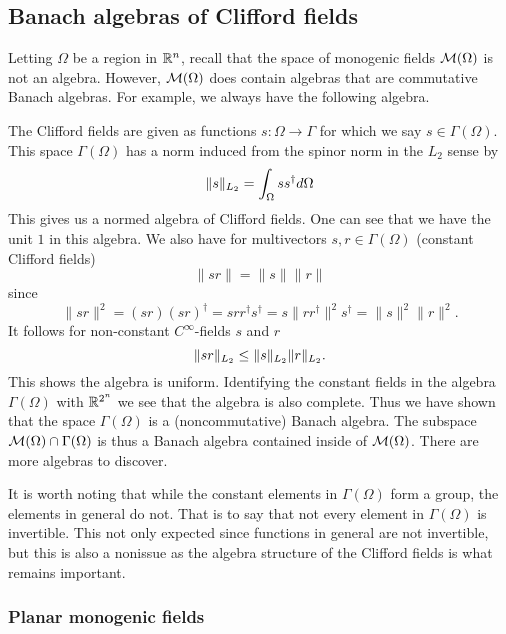 \subsection{Banach algebras of Clifford fields}


Letting $\Omega$ be a region in $\mathbb{R}^n$, recall that the space of monogenic fields $\mathcal{M}(\Omega)$ is not an algebra. However, $\mathcal{M}(\Omega)$ does contain algebras that are commutative Banach algebras. For example, we always have the following algebra.

The Clifford fields are given as functions $s \colon \Omega \to \Gamma$ for which we say $s\in \Gamma(\Omega)$. This space $\Gamma(\Omega)$ has a norm induced from the spinor norm in the $L_2$ sense by
\[
\|s\|_{L_2} = \int_\Omega ss^\dagger d\Omega
\]
This gives us a normed algebra of Clifford fields. One can see that we have the unit $1$ in this algebra. We also have for multivectors $s,r \in \Gamma(\Omega)$ (constant Clifford fields)
\[
\|sr\| = \|s\|\|r\|
\]
since
\[
\|sr\|^2 = (sr)(sr)^\dagger = srr^\dagger s^\dagger = s\|rr^\dagger\|^2 s^\dagger = \|s\|^2 \|r\|^2.
\]
It follows for non-constant $C^\infty$-fields $s$ and $r$
\[
\|sr\|_{L_2} \leq \|s\|_{L_2}\|r\|_{L_2}.
\]
This shows the algebra is uniform. Identifying the constant fields in the algebra $\Gamma(\Omega)$ with $\mathbb{R}^{2^n}$ we see that the algebra is also complete. Thus we have shown that the space $\Gamma(\Omega)$ is a (noncommutative) Banach algebra. The subspace $\mathcal{M}(\Omega)\cap \Gamma(\Omega)$ is thus a Banach algebra contained inside of $\mathcal{M}(\Omega)$. There are more algebras to discover.

\begin{remark}
It is worth noting that while the constant elements in $\Gamma(\Omega)$ form a group, the elements in general do not.  That is to say that not every element in $\Gamma(\Omega)$ is invertible.  This not only expected since functions in general are not invertible, but this is also a nonissue as the algebra structure of the Clifford fields is what remains important.
\end{remark}

\subsubsection{Planar monogenic fields}

